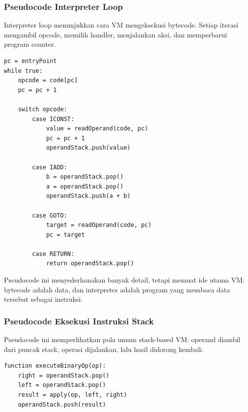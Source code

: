 \subsubsection{Pseudocode Interpreter Loop}

\begin{jawab}
Interpreter loop menunjukkan cara VM mengeksekusi bytecode. Setiap iterasi mengambil opcode, memilih handler, menjalankan aksi, dan memperbarui program counter.
\end{jawab}

\begin{lstlisting}[caption={Pseudocode fetch-decode-execute VM}, label={lst:vm-interpreter-loop}]
pc = entryPoint
while true:
    opcode = code[pc]
    pc = pc + 1

    switch opcode:
        case ICONST:
            value = readOperand(code, pc)
            pc = pc + 1
            operandStack.push(value)

        case IADD:
            b = operandStack.pop()
            a = operandStack.pop()
            operandStack.push(a + b)

        case GOTO:
            target = readOperand(code, pc)
            pc = target

        case RETURN:
            return operandStack.pop()
\end{lstlisting}

Pseudocode ini menyederhanakan banyak detail, tetapi memuat ide utama VM: bytecode adalah data, dan interpreter adalah program yang membaca data tersebut sebagai instruksi.

\subsubsection{Pseudocode Eksekusi Instruksi Stack}

\begin{jawab}
Pseudocode ini memperlihatkan pola umum stack-based VM: operand diambil dari puncak stack, operasi dijalankan, lalu hasil didorong kembali.
\end{jawab}

\begin{lstlisting}[caption={Pola instruksi aritmetika stack-based VM}, label={lst:stack-vm-op}]
function executeBinaryOp(op):
    right = operandStack.pop()
    left = operandStack.pop()
    result = apply(op, left, right)
    operandStack.push(result)
\end{lstlisting}

